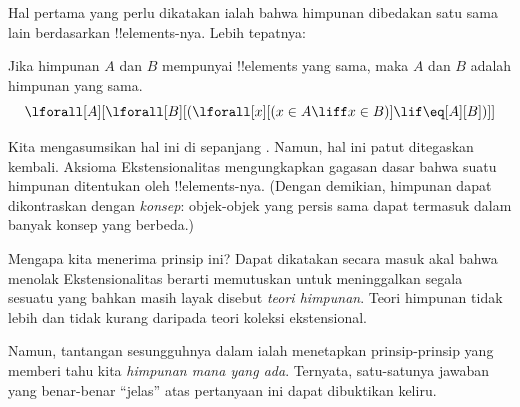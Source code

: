 \documentclass[../../../include/open-logic-section]{subfiles}
\begin{document}

Hal pertama yang perlu dikatakan ialah bahwa himpunan dibedakan satu sama
lain berdasarkan !!{element}s-nya. Lebih tepatnya:

\begin{axiom}[Ekstensionalitas]
Jika himpunan $A$ dan $B$ mempunyai !!{element}s yang sama, maka $A$
dan $B$ adalah himpunan yang sama.
\[
  \lforall[A][\lforall[B][(\lforall[x][(x \in A \liff x \in B)] \lif
  \eq[A][B])]]
\]
\end{axiom}

Kita mengasumsikan hal ini di sepanjang . Namun, hal
ini patut ditegaskan kembali. Aksioma Ekstensionalitas mengungkapkan gagasan
dasar bahwa suatu himpunan ditentukan oleh !!{element}s-nya. (Dengan
demikian, himpunan dapat dikontraskan dengan \emph{konsep}: objek-objek yang
persis sama dapat termasuk dalam banyak konsep yang berbeda.)

Mengapa kita menerima prinsip ini? Dapat dikatakan secara masuk akal bahwa
menolak Ekstensionalitas berarti memutuskan untuk meninggalkan segala sesuatu
yang bahkan masih layak disebut \emph{teori himpunan}. Teori himpunan tidak
lebih dan tidak kurang daripada teori koleksi ekstensional.

Namun, tantangan sesungguhnya dalam  ialah menetapkan
prinsip-prinsip yang memberi tahu kita \emph{himpunan mana yang ada}. Ternyata,
satu-satunya jawaban yang benar-benar ``jelas'' atas pertanyaan ini dapat
dibuktikan keliru.
\end{document}
